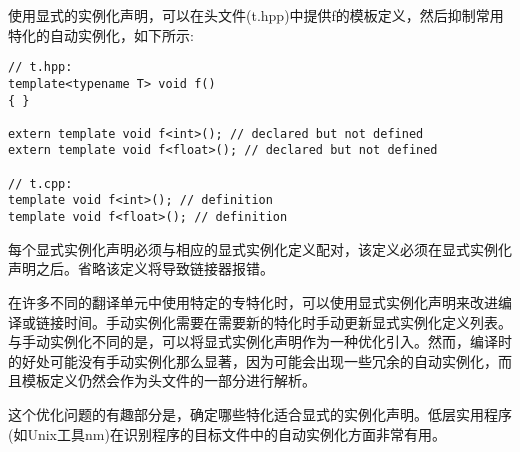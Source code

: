 使用显式的实例化声明，可以在头文件(t.hpp)中提供f的模板定义，然后抑制常用特化的自动实例化，如下所示:

\begin{lstlisting}[style=styleCXX]
// t.hpp:
template<typename T> void f()
{ }

extern template void f<int>(); // declared but not defined
extern template void f<float>(); // declared but not defined

// t.cpp:
template void f<int>(); // definition
template void f<float>(); // definition
\end{lstlisting}

每个显式实例化声明必须与相应的显式实例化定义配对，该定义必须在显式实例化声明之后。省略该定义将导致链接器报错。

在许多不同的翻译单元中使用特定的专特化时，可以使用显式实例化声明来改进编译或链接时间。手动实例化需要在需要新的特化时手动更新显式实例化定义列表。与手动实例化不同的是，可以将显式实例化声明作为一种优化引入。然而，编译时的好处可能没有手动实例化那么显著，因为可能会出现一些冗余的自动实例化，而且模板定义仍然会作为头文件的一部分进行解析。

\begin{tcolorbox}[colback=webgreen!5!white,colframe=webgreen!75!black]
\hspace*{0.75cm}这个优化问题的有趣部分是，确定哪些特化适合显式的实例化声明。低层实用程序(如Unix工具nm)在识别程序的目标文件中的自动实例化方面非常有用。
\end{tcolorbox}

















